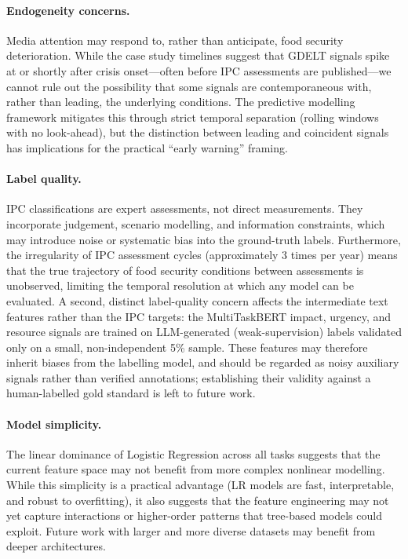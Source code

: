 \documentclass{article}
\begin{document}
\paragraph{Endogeneity concerns.}
Media attention may respond to, rather than anticipate, food security deterioration. While the case study timelines suggest that GDELT signals spike at or shortly after crisis onset---often before IPC assessments are published---we cannot rule out the possibility that some signals are contemporaneous with, rather than leading, the underlying conditions. The predictive modelling framework mitigates this through strict temporal separation (rolling windows with no look-ahead), but the distinction between leading and coincident signals has implications for the practical ``early warning'' framing.

\paragraph{Label quality.}
IPC classifications are expert assessments, not direct measurements. They incorporate judgement, scenario modelling, and information constraints, which may introduce noise or systematic bias into the ground-truth labels. Furthermore, the irregularity of IPC assessment cycles (approximately 3 times per year) means that the true trajectory of food security conditions between assessments is unobserved, limiting the temporal resolution at which any model can be evaluated. A second, distinct label-quality concern affects the intermediate text features rather than the IPC targets: the MultiTaskBERT impact, urgency, and resource signals are trained on LLM-generated (weak-supervision) labels validated only on a small, non-independent 5\% sample. These features may therefore inherit biases from the labelling model, and should be regarded as noisy auxiliary signals rather than verified annotations; establishing their validity against a human-labelled gold standard is left to future work.

\paragraph{Model simplicity.}
The linear dominance of Logistic Regression across all tasks suggests that the current feature space may not benefit from more complex nonlinear modelling. While this simplicity is a practical advantage (LR models are fast, interpretable, and robust to overfitting), it also suggests that the feature engineering may not yet capture interactions or higher-order patterns that tree-based models could exploit. Future work with larger and more diverse datasets may benefit from deeper architectures.
\end{document}
